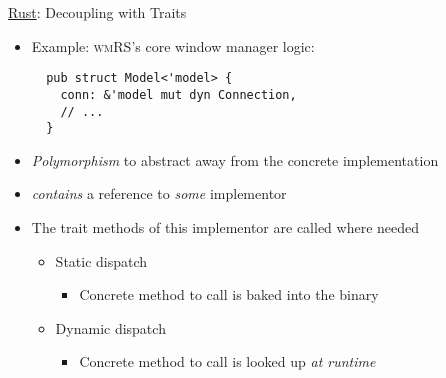 \begin{frame}[fragile]{\underline{Rust}: Decoupling with Traits \hfill {\footnotesize \currentname}}


    \begin{itemize}

        \item Example: \textsc{wmRS}'s core window manager logic:\\
\begin{verbatim}
  pub struct Model<'model> {
    conn: &'model mut dyn Connection,
    // ...
  }
\end{verbatim}

        \item \textit{Polymorphism} to abstract away from the concrete implementation\\

        \item {} \textit{contains} a reference to \textit{some}  implementor\\

        \item The trait methods of this implementor are called where needed\\
            \begin{itemize}
                \item Static dispatch
                    \begin{itemize}
                        \item Concrete method to call is baked into the binary
                    \end{itemize}
                \item Dynamic dispatch
                    \begin{itemize}
                        \item Concrete method to call is looked up \textit{at runtime}
                    \end{itemize}
            \end{itemize}

    \end{itemize}

    \vfill

\end{frame}


